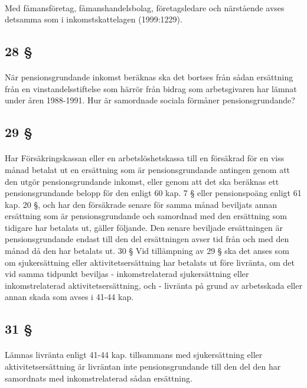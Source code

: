 \documentclass[a4paper,notitlepage,openany,10pt]{book}
\begin{document}
\paragraph*{}
Med fåmansföretag, fåmanshandelsbolag, företagsledare och närstående avses detsamma som i inkomstskattelagen (1999:1229).
\subsection*{28 §}
\paragraph*{}
När pensionsgrundande inkomst beräknas ska det bortses från sådan ersättning från en vinstandelsstiftelse som härrör från bidrag som arbetsgivaren har lämnat under åren 1988-1991.
Hur är samordnade sociala förmåner pensionsgrundande?
\subsection*{29 §}
\paragraph*{}
Har Försäkringskassan eller en arbetslöshetskassa till en försäkrad för en viss månad betalat ut en ersättning som är pensionsgrundande antingen genom att den utgör pensionsgrundande inkomst, eller genom att det ska beräknas ett pensionsgrundande belopp för den enligt 60 kap. 7 § eller pensionspoäng enligt 61 kap. 20 §, och har den försäkrade senare för samma månad beviljats annan ersättning som är pensionsgrundande och samordnad med den ersättning som tidigare har betalats ut, gäller följande. Den senare beviljade ersättningen är pensionsgrundande endast till den del ersättningen avser tid från och med den månad då den har betalats ut. 30 § Vid tillämpning av 29 § ska det anses som om sjukersättning eller aktivitetsersättning har betalats ut före livränta, om det vid samma tidpunkt beviljas
\newline - inkomstrelaterad sjukersättning eller inkomstrelaterad aktivitetsersättning, och - livränta på grund av arbetsskada eller annan skada som avses i 41-44 kap.
\subsection*{31 §}
\paragraph*{}
Lämnas livränta enligt 41-44 kap. tillsammans med sjukersättning eller aktivitetsersättning är livräntan inte pensionsgrundande till den del den har samordnats med inkomstrelaterad sådan ersättning.
\end{document}
